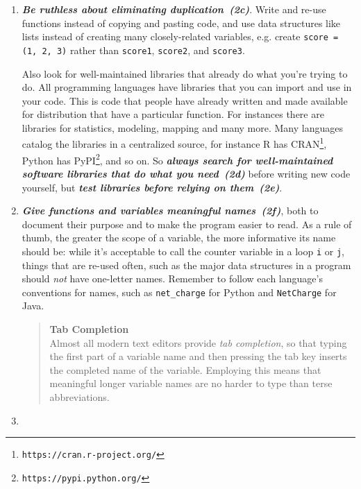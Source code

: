 \documentclass[10pt,letterpaper]{article}
\newcommand{\withurl}[2]{{#1}\footnote{{\texttt{#2}}}}
\newcommand{\practice}[2]{\textbf{\emph{{#2}~({#1})}}}
\begin{document}
\begin{enumerate}
\item

  \practice{2c}{Be ruthless about eliminating duplication}. Write and
  re-use functions instead of copying and pasting code, and use data
  structures like lists instead of creating many closely-related
  variables, e.g. create \texttt{score = (1, 2, 3)} rather than
  \texttt{score1}, \texttt{score2}, and \texttt{score3}.

  Also look for well-maintained libraries that already do what you're
  trying to do. All programming languages have libraries that you can
  import and use in your code. This is code that people have already
  written and made available for distribution that have a particular
  function. For instances there are libraries for statistics,
  modeling, mapping and many more. Many languages catalog the
  libraries in a centralized source, for instance R has
  \withurl{CRAN}{https://cran.r-project.org/}, Python has
  \withurl{PyPI}{https://pypi.python.org/}, and so on.  So
  \practice{2d}{always search for well-maintained software libraries
  that do what you need} before writing new code yourself, but
  \practice{2e}{test libraries before relying on them}.

\item

  \practice{2f}{Give functions and variables meaningful names}, both
  to document their purpose and to make the program easier to read. As
  a rule of thumb, the greater the scope of a variable, the more
  informative its name should be: while it's acceptable to call the
  counter variable in a loop \texttt{i} or \texttt{j}, things that are
  re-used often, such as the major data structures in a program should
  \emph{not} have one-letter names.  Remember to follow each
  language's conventions for names, such as \texttt{net\_charge} for
  Python and \texttt{NetCharge} for Java.

  \begin{quote}
    \noindent \textbf{Tab Completion}
    \\
    Almost all modern text editors provide \emph{tab completion}, so
    that typing the first part of a variable name and then pressing
    the tab key inserts the completed name of the variable.  Employing
    this means that meaningful longer variable names are no harder to
    type than terse abbreviations.
  \end{quote}

\item


\end{enumerate}
\end{document}
